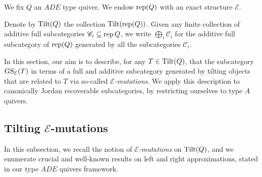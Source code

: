 \pagestyle{plain}

\begin{conv}\label{conv:typeA}
    We fix $Q$ an $ADE$ type quiver. We endow $\operatorname{rep}(Q)$ with an exact structure $\mathcal{E}$.
\end{conv}

Denote by $\operatorname{Tilt}(Q)$ the collection $\operatorname{Tilt}(\operatorname{rep}(Q))$.
Given any finite collection of additive full subcategories $\mathscr{C}_i \subseteq \operatorname{rep} Q$, we write $\bigoplus_i \mathscr{C}_i$ for the additive full subcategory of $\operatorname{rep}(Q)$ generated by all the subcategories $\mathscr{C}_i$.

In this section, our aim is to describe, for any $T \in \operatorname{Tilt}(Q)$, that the subcategory $\operatorname{GS}_\mathcal{E}(T)$ in terms of a full and additive subcategory generated by tilting objects that are related to $T$ via so-called \emph{$\mathcal{E}$-mutations}. We apply this description to canonically Jordan recoverable subcategories, by restricting ourselves to type $A$ quivers. 

\subsection{Tilting \texorpdfstring{$\mathcal{E}$}{TEXT}-mutations}
\label{ss:Tiltmut} In this subsection, we recall the notion of \emph{$\mathcal{E}$-mutations} on $\operatorname{Tilt}(Q)$, and we enumerate crucial and well-known results on left and right approximations, stated in our type $ADE$ quivers framework.

